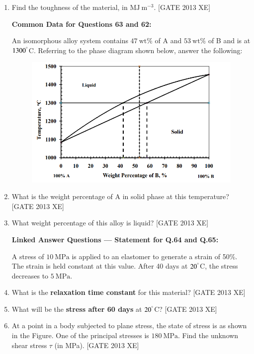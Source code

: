 \documentclass[journal,12pt,onecolumn]{IEEEtran}
\theoremstyle{remark}
\begin{document}
\begin{enumerate}
\item Find the toughness of the material, in $\mathrm{MJ\ m^{-3}}$. \underline{\hspace{2cm}} \hfill[GATE 2013 XE]

\textbf{Common Data for Questions 63 and 62:}  

An isomorphous alloy system contains $47 \ \mathrm{wt\%}$ of A and $53 \ \mathrm{wt\%}$ of B and is at $1300^\degree$C.  
Referring to the phase diagram shown below, answer the following:
\begin{figure}[H]
    \centering
    \includegraphics[width=0.5\columnwidth]{figs/fig8.png}
    \caption{}
    \label{fig:fig 8}
\end{figure}
\item What is the weight percentage of A in solid phase at this temperature? \underline{\hspace{2cm}} \hfill[GATE 2013 XE]

\item What weight percentage of this alloy is liquid? \underline{\hspace{2cm}}\hfill[GATE 2013 XE]

\textbf{Linked Answer Questions — Statement for Q.64 and Q.65:}  

A stress of $10\ \mathrm{MPa}$ is applied to an elastomer to generate a strain of 50\%. The strain is held constant at this value. After 40 days at $20^\degree$C, the stress decreases to $5\ \mathrm{MPa}$.

\item What is the \textbf{relaxation time constant} for this material? \underline{\hspace{2cm}}\hfill[GATE 2013 XE]

\item What will be the \textbf{stress after 60 days} at $20^\degree$C? \underline{\hspace{2cm}}\hfill[GATE 2013 XE]

\item At a point in a body subjected to plane stress, the state of stress is as shown in the Figure. One of the principal stresses is $180 \ \mathrm{MPa}$. Find the unknown shear stress $\tau$ (in MPa). \underline{\hspace{2cm}}\hfill[GATE 2013 XE]


\end{enumerate}
\end{document}
